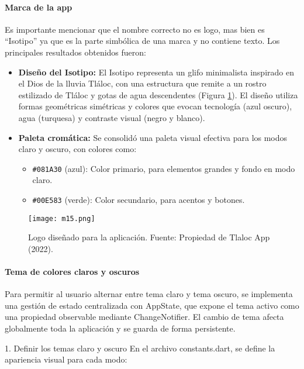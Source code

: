 \paragraph{Marca de la app}
Es importante mencionar que el nombre correcto no es logo, mas bien es ``Isotipo'' ya que es la parte simbólica de una marca y no contiene texto. Los principales resultados obtenidos fueron:

\begin{itemize}
  \item \textbf{Diseño del Isotipo:} El Isotipo representa un glifo minimalista inspirado en el Dios de la lluvia Tláloc, con una estructura que remite a un rostro estilizado de Tláloc y gotas de agua descendentes (Figura \ref{m15}). El diseño utiliza formas geométricas simétricas y colores que evocan tecnología (azul oscuro), agua (turquesa) y contraste visual (negro y blanco).
  
  \item \textbf{Paleta cromática:} Se consolidó una paleta visual efectiva para los modos claro y oscuro, con colores como:
  \begin{itemize}
    \item \texttt{\#081A30} (azul): Color primario, para elementos grandes y fondo en modo claro.
    \item \texttt{\#00E583} (verde): Color secundario, para acentos y botones.
  \end{itemize} 
\end{itemize} 
\begin{figure}[h!]
\centering
  \texttt{[image: m15.png]}
  \caption{Logo diseñado para la aplicación. Fuente: Propiedad de Tlaloc App (2022).}
  \label{m15}
\end{figure}






\paragraph{Tema de colores claros y oscuros}


Para permitir al usuario alternar entre tema claro y tema oscuro, se implementa una gestión de estado centralizada con AppState, que expone el tema activo como una propiedad observable mediante ChangeNotifier. El cambio de tema afecta globalmente toda la aplicación y se guarda de forma persistente.

1. Definir los temas claro y oscuro
En el archivo constants.dart, se define la apariencia visual para cada modo:


